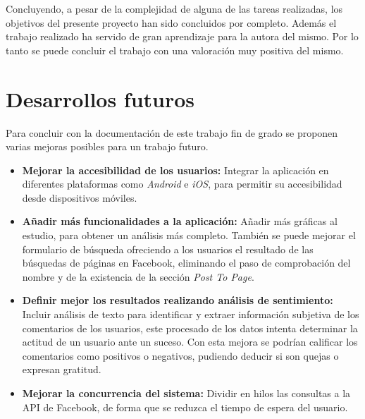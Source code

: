 Concluyendo, a pesar de la complejidad de alguna de las tareas realizadas, los objetivos del presente proyecto han sido concluidos por completo. Además el trabajo realizado ha servido de gran aprendizaje para la autora del mismo. Por lo tanto se puede concluir el trabajo con una valoración muy positiva del mismo.

\section{Desarrollos futuros}
Para concluir con la documentación de este trabajo fin de grado se proponen varias mejoras posibles para un trabajo futuro.
\begin{itemize}
\item \textbf{Mejorar la accesibilidad de los usuarios:} Integrar la aplicación en diferentes plataformas como \textit{Android} e \textit{iOS}, para permitir su accesibilidad desde dispositivos móviles.
\item \textbf{Añadir más funcionalidades a la aplicación:} Añadir más gráficas al estudio, para obtener un análisis más completo. También se puede mejorar el formulario de búsqueda ofreciendo a los usuarios el resultado de las búsquedas de páginas en Facebook, eliminando el paso de comprobación del nombre y de la existencia de la sección \textit{Post To Page}. 
\item \textbf{Definir mejor los resultados realizando análisis de sentimiento:} Incluir análisis de texto para identificar y extraer información subjetiva de los comentarios de los usuarios, este procesado de los datos intenta determinar la actitud de un usuario ante un suceso. Con esta mejora se podrían calificar los comentarios como positivos o negativos, pudiendo deducir si son quejas o expresan gratitud.  
\item \textbf{Mejorar la concurrencia del sistema:} Dividir en hilos las consultas a la API de Facebook, de forma que se reduzca el tiempo de espera del usuario.
\end{itemize}